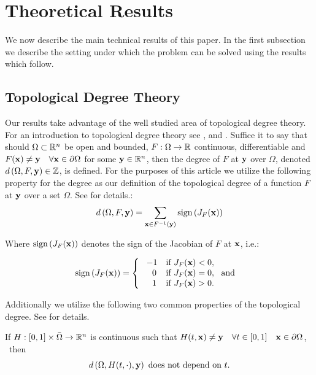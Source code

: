 \section{Theoretical Results} \label{sec:theory}  
We now describe the main technical results of this paper. 
In the first subsection we describe the setting under which the problem can be solved using the results which follow. 
\subsection{Topological Degree Theory}
Our results take advantage of the well studied area of topological degree theory. 
For an introduction to topological degree theory see \cite{OrChCh2006}, \cite{fonseca1995degree} and \cite{MoVrYa2002}. 
Suffice it to say that should $\Omega\subset\mathbb{R}^{n}$ be open and bounded, $F:\Omega\rightarrow \mathbb{R}$ continuous, differentiable and $F(\mathbf{x}) \neq \mathbf{y} \quad \forall \mathbf{x}\in\partial\Omega$ for some $\mathbf{y}\in\mathbb{R}^n$, then the degree of $F$ at $\mathbf{y}$ over $\Omega$, denoted $d\left(\Omega,F,\mathbf{y}\right)\in\mathbb{Z}$, is defined. 
For the purposes of this article we utilize the following property for the degree as our definition of the topological degree of a function $F$ at $\mathbf{y}$ over a set $\Omega$. 
See \cite{OrChCh2006} for details.:
\begin{equation}\label{eq:Deg3}
d\left(\Omega,F,\mathbf{y}\right)=\sum\limits_{\mathbf{x}\in F^{-1}(\mathbf{y})}\operatorname{sign}\left(J_F(\mathbf{x})\right)
\end{equation}

Where $\operatorname{sign}\left(J_F(\mathbf{x})\right)$ denotes the sign of the Jacobian of $F$ at $\mathbf{x}$, i.e.:

\[\operatorname{sign}\left(J_F(\mathbf{x})\right)=   \left\{
\begin{array}{ll}
       \ -1   & \mbox{if } J_F(\mathbf{x})< 0, \\
      \quad 0 & \mbox{if } J_F(\mathbf{x})= 0,~\mbox{ and } \\
      \quad 1 & \mbox{if } J_F(\mathbf{x})> 0. \\
\end{array} 
\right. \]

Additionally we utilize the following two common properties of the topological degree. 
See \cite{OrChCh2006} for details. 

If $H : [0,1]\times\bar{\Omega}\rightarrow\mathbb{R}^n$ is continuous such that $H(t,\mathbf{x})\neq \mathbf{y} \quad \forall t\in[0,1]\quad \mathbf{x}\in\partial\Omega$,   \ then 
\begin{equation}\label{eq:Deg1} 
d\left(\Omega,H(t,\cdot),\mathbf{y}\right)\text{ does not depend on }t.
\end{equation}

